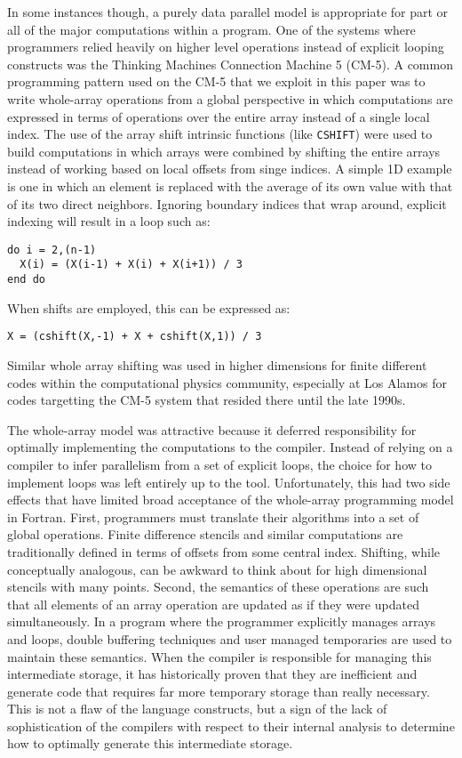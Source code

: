 In some instances though, a purely data parallel model is appropriate
for part or all of the major computations within a program.  One of
the systems where programmers relied heavily on higher level
operations instead of explicit looping constructs was the Thinking
Machines Connection Machine 5 (CM-5).  A common programming pattern
used on the CM-5 that we exploit in this paper was to write
whole-array operations from a global perspective in which computations
are expressed in terms of operations over the entire array instead of
a single local index.  The use of the array shift intrinsic functions
(like {\tt CSHIFT}) were used to build computations in which arrays
were combined by shifting the entire arrays instead of working based
on local offsets from singe indices.  A simple 1D example is one in
which an element is replaced with the average of its own value with
that of its two direct neighbors.  Ignoring boundary indices that wrap
around, explicit indexing will result in a loop such as:

\begin{verbatim}
do i = 2,(n-1)
  X(i) = (X(i-1) + X(i) + X(i+1)) / 3
end do
\end{verbatim}

When shifts are employed, this can be expressed as:

\begin{verbatim}
X = (cshift(X,-1) + X + cshift(X,1)) / 3
\end{verbatim}

Similar whole array shifting was used in higher dimensions for finite
different codes within the computational physics community, especially
at Los Alamos for codes targetting the CM-5 system that resided there until the
late 1990s.  

The whole-array model was attractive because it deferred
responsibility for optimally implementing the computations to the
compiler.  Instead of relying on a compiler to infer parallelism from
a set of explicit loops, the choice for how to implement loops was
left entirely up to the tool.  Unfortunately, this had two side
effects that have limited broad acceptance of the whole-array
programming model in Fortran.  First, programmers must translate their
algorithms into a set of global operations.  Finite difference
stencils and similar computations are traditionally defined in terms
of offsets from some central index.  Shifting, while conceptually
analogous, can be awkward to think about for high dimensional stencils
with many points.  Second, the semantics of these operations are such
that all elements of an array operation are updated as if they were
updated simultaneously.  In a program where the programmer explicitly
manages arrays and loops, double buffering techniques and user managed
temporaries are used to maintain these semantics.  When the compiler
is responsible for managing this intermediate storage, it has
historically proven that they are inefficient and generate code that
requires far more temporary storage than really necessary.  This is
not a flaw of the language constructs, but a sign of the lack of
sophistication of the compilers with respect to their internal
analysis to determine how to optimally generate this intermediate
storage.

